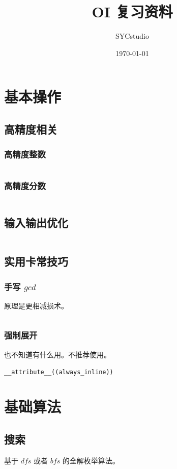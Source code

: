 \documentclass[UTF-8]{ctexart}
\title{OI 复习资料}
\author{SYCstudio}
\date{\today}
\newcommand{\cpp}[1]{\inputminted[bgcolor=bg,breaklines,breakanywhere=true]{c++}{#1}}
\begin{document}
	\maketitle%
	\newpage
	\tableofcontents%
	\newpage%
	\section{基本操作}
		\subsection{高精度相关}
			\subsubsection{高精度整数}
			\cpp{code//Basic//biginteger.cpp}
			\subsubsection{高精度分数}
			\cpp{code//Basic//bigfraction.cpp}
		\subsection{输入输出优化}
		\cpp{code//Basic//io.cpp}
		\subsection{实用卡常技巧}
			\subsubsection{手写 $gcd$}
			原理是更相减损术。
			\cpp{code//Basic//fastgcd.cpp}
			\subsubsection{强制展开}
			也不知道有什么用。不推荐使用。

			\texttt{__attribute__((always_inline))}

	\newpage

	\section{基础算法}
		\subsection{搜索}
		基于 $dfs$ 或者 $bfs$ 的全解枚举算法。
\end{document}

